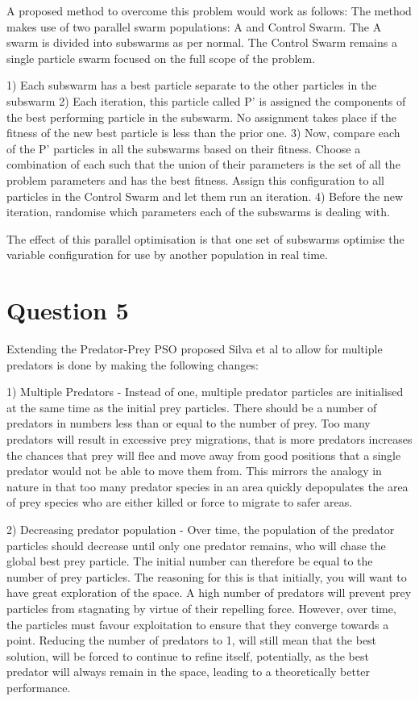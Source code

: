 \documentclass[12pt]{article}
\begin{document}
A proposed method to overcome this problem would work as follows:
The method makes use of two parallel swarm populations: A and Control Swarm. The A swarm is divided into subswarms as per normal. The Control Swarm remains a single particle swarm focused on the full scope of the problem.

	1) Each subswarm has a best particle separate to the other particles in the subswarm
	2) Each iteration, this particle called P' is assigned the components of the best performing particle in the subswarm. No assignment takes place if the fitness of the new best particle is less than the prior one.
	3) Now, compare each of the P' particles in all the subswarms based on their fitness.
	Choose a combination of each such that the union of their parameters is the set of all the problem parameters and has the best fitness. Assign this configuration to all particles in the Control Swarm and let them run an iteration.
	4) Before the new iteration, randomise which parameters each of the subswarms is dealing with.

The effect of this parallel optimisation is that one set of subswarms optimise the variable configuration for use by another population in real time.
\section{Question 5}
Extending the Predator-Prey PSO proposed Silva et al to allow for multiple predators is done by making the following changes:

	1) Multiple Predators - Instead of one, multiple predator particles are initialised at the same time as the initial prey particles. There should be a number of predators in numbers less than or equal to the number of prey. Too many predators will result in excessive prey migrations, that is more predators increases the chances that prey will flee and move away from good positions that a single predator would not be able to move them from. This mirrors the analogy in nature in that too many predator species in an area quickly depopulates the area of prey species who are either killed or force to migrate to safer areas.

	2) Decreasing predator population - Over time, the population of the predator particles should decrease until only one predator remains, who will chase the global best prey particle. The initial number can therefore be equal to the number of prey particles. The reasoning for this is that initially, you will want to have great exploration of the space. A high number of predators will prevent prey particles from stagnating by virtue of their repelling force. However, over time, the particles must favour exploitation to ensure that they converge towards a point. Reducing the number of predators to 1, will still mean that the best solution, will be forced to continue to refine itself, potentially, as the best predator will always remain in the space, leading to a theoretically better performance.
\end{document}
